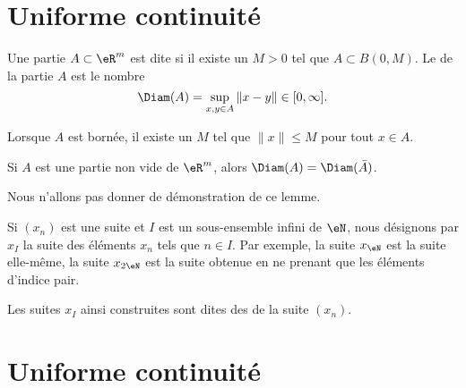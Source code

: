 
\section{Uniforme continuité}		\label{SecUnifContinue}

\begin{definition}
	Une partie \( A\subset\eR^m\) est dite  si il existe un \( M>0\) tel que \( A\subset B(0,M)\). Le  de la partie \( A\) est le nombre
	\begin{equation}
		\Diam(A)=\sup_{x,y\in A}\| x-y \|\in\mathopen[ 0 , \infty \mathclose].
	\end{equation}
\end{definition}
Lorsque \( A\) est bornée, il existe un \( M\) tel que \( \| x \|\leq M\) pour tout \( x\in A\).

\begin{lemma}
	Si \( A\) est une partie non vide de \( \eR^m\), alors \( \Diam(A)=\Diam(\bar A)\).
\end{lemma}
Nous n'allons pas donner de démonstration de ce lemme.


Si \( (x_n)\) est une suite et \( I\) est un sous-ensemble infini de \( \eN\), nous désignons par \( x_I\) la suite des éléments \( x_n\) tels que \( n\in I\). Par exemple, la suite \( x_{\eN}\) est la suite elle-même, la suite \( x_{2\eN}\) est la suite obtenue en ne prenant que les éléments d'indice pair.

Les suites \( x_I\) ainsi construites sont dites des  de la suite \( (x_n)\).


\section{Uniforme continuité}
\label{SECooZSZMooBYSDFO}

